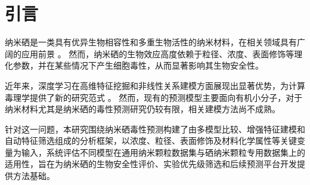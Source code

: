 \section{引言}

纳米硒是一类具有优异生物相容性和多重生物活性的纳米材料，在相关领域具有广阔的应用前景 \cite{liu2012senps,wang2022tcmp}。
然而，纳米硒的生物效应高度依赖于粒径、浓度、表面修饰等理化参数，并在某些情况下产生细胞毒性，从而显著影响其生物安全性。


近年来，深度学习在高维特征挖掘和非线性关系建模方面展现出显著优势，为计算毒理学提供了新的研究范式 \cite{guo2023toxicity}。
然而，现有的预测模型主要面向有机小分子，对于纳米材料尤其是纳米硒的毒性预测研究仍较有限，相关建模方法尚不成熟。

针对这一问题，本研究围绕纳米硒毒性预测构建了由多模型比较、增强特征建模和自动特征筛选组成的分析框架，以浓度、粒径、表面修饰及材料化学属性等关键变量为输入，系统评估不同模型在通用纳米颗粒数据集与硒纳米颗粒专用数据集上的适用性，旨在为纳米硒的生物安全性评价、实验优先级筛选和后续预测平台开发提供方法基础。
